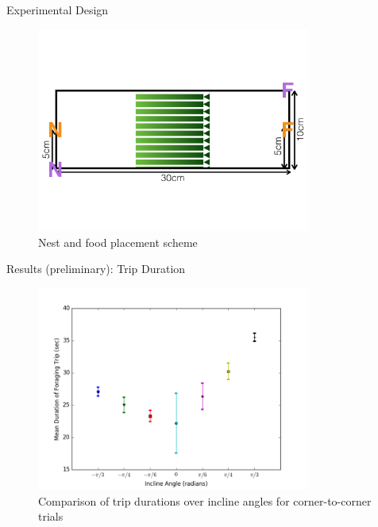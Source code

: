 \begin{frame}{Experimental Design}

   \begin{figure}
    	\includegraphics[width=0.8\textwidth]{images/model_components_cartoons_010}
				\vspace{-8ex}
				\caption{Nest and food placement scheme}
    \end{figure}
\end{frame}

\begin{frame}{Results (preliminary): Trip Duration}
\begin{figure}
\includegraphics[width=0.8\textwidth]{results/corner-to-cornermeandurationofforagingtrip.png}
\caption{Comparison of trip durations over incline angles for corner-to-corner trials}
\end{figure}
\end{frame}